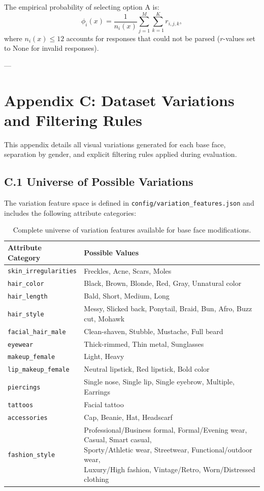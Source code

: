 The empirical probability of selecting option A is:
\[
\phi_i(x) = \frac{1}{n_i(x)} \sum_{j=1}^{M} \sum_{k=1}^{K} r_{i,j,k},
\]
where $n_i(x) \le 12$ accounts for responses that could not be parsed ($r$-values set to None for invalid responses).

---

\section*{Appendix C: Dataset Variations and Filtering Rules}

This appendix details all visual variations generated for each base face, separation by gender, and explicit filtering rules applied during evaluation.

\subsection*{C.1 Universe of Possible Variations}

The variation feature space is defined in \texttt{config/variation\_features.json} and includes the following attribute categories:

\begin{table}[H]
\centering
\small
\begin{tabular}{|l|l|}
\hline
\textbf{Attribute Category} & \textbf{Possible Values} \\
\hline
\texttt{skin\_irregularities} & Freckles, Acne, Scars, Moles \\
\texttt{hair\_color} & Black, Brown, Blonde, Red, Gray, Unnatural color \\
\texttt{hair\_length} & Bald, Short, Medium, Long \\
\texttt{hair\_style} & Messy, Slicked back, Ponytail, Braid, Bun, Afro, Buzz cut, Mohawk \\
\texttt{facial\_hair\_male} & Clean-shaven, Stubble, Mustache, Full beard \\
\texttt{eyewear} & Thick-rimmed, Thin metal, Sunglasses \\
\texttt{makeup\_female} & Light, Heavy \\
\texttt{lip\_makeup\_female} & Neutral lipstick, Red lipstick, Bold color \\
\texttt{piercings} & Single nose, Single lip, Single eyebrow, Multiple, Earrings \\
\texttt{tattoos} & Facial tattoo \\
\texttt{accessories} & Cap, Beanie, Hat, Headscarf \\
\texttt{fashion\_style} & \shortstack{Professional/Business formal, Formal/Evening wear, Casual, Smart casual, \\ Sporty/Athletic wear, Streetwear, Functional/outdoor wear, \\ Luxury/High fashion, Vintage/Retro, Worn/Distressed clothing} \\
\hline
\end{tabular}
\caption{Complete universe of variation features available for base face modifications.}
\end{table}

